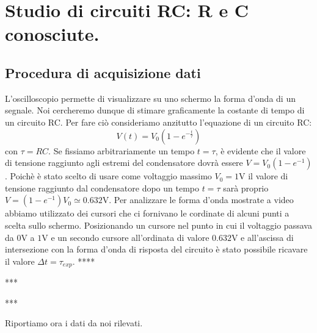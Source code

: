 \section{Studio di circuiti RC: R e C conosciute.}
\subsection{Procedura di acquisizione dati}
L'oscilloscopio permette di visualizzare su uno schermo la forma d'onda di un segnale. Noi cercheremo dunque di stimare graficamente la costante di tempo di un circuito RC. Per fare ciò consideriamo anzitutto l'equazione di un circuito RC:
\begin{equation}
V(t)=V_0(1-e^{-\frac{t}{\tau}})
\label{RC}
\end{equation}
con $\tau=RC$. Se fissiamo arbitrariamente un tempo $t=\tau$, è evidente che il valore di tensione raggiunto agli estremi del condensatore dovrà essere $V=V_0(1-e^{-1})$. Poichè è stato scelto di usare come voltaggio massimo $V_0 = 1\si{\volt}$ il valore di tensione raggiunto dal condensatore dopo un tempo $t=\tau$ sarà proprio $V=(1-e^{-1})V_0 \simeq 0.632\si{\volt}$. 
Per analizzare le forma d'onda mostrate a video abbiamo utilizzato dei cursori che ci fornivano le cordinate di alcuni punti a scelta sullo schermo. Posizionando un cursore nel punto in cui il voltaggio passava da $0\si{\volt}$ a $1\si{\volt}$ e un secondo cursore all'ordinata di valore $0.632\si{\volt}$ e all'ascissa di intersezione con la forma d'onda di risposta del circuito è stato possibile ricavare il valore $\Delta t = \tau_{exp}$.
****

***

***


Riportiamo ora i dati da noi rilevati.

